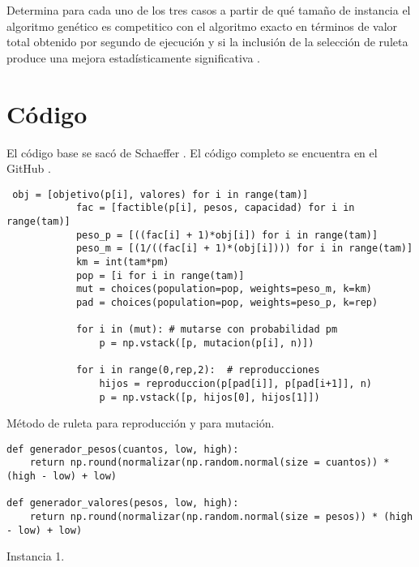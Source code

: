 \documentclass{article}
\begin{document}
Determina para cada uno de los tres casos a partir de qué tamaño de instancia el algoritmo genético es competitico con el algoritmo exacto en términos de valor total obtenido por segundo de ejecución y si la inclusión de la selección de ruleta produce una mejora estadísticamente significativa \cite{Satu_Elisa_Schaeffer}.

\newpage
\section{Código}
El código base se sacó de Schaeffer \cite{Elisa_Schaeffer}. El código completo se encuentra en el GitHub \cite{Denisse_Leyva}.

\renewcommand{\listingscaption}{Código}
\begin{listing}[H]
  \begin{verbatim}
 obj = [objetivo(p[i], valores) for i in range(tam)]
            fac = [factible(p[i], pesos, capacidad) for i in range(tam)]
            peso_p = [((fac[i] + 1)*obj[i]) for i in range(tam)]
            peso_m = [(1/((fac[i] + 1)*(obj[i]))) for i in range(tam)]
            km = int(tam*pm)
            pop = [i for i in range(tam)]
            mut = choices(population=pop, weights=peso_m, k=km)
            pad = choices(population=pop, weights=peso_p, k=rep)
        
            for i in (mut): # mutarse con probabilidad pm
                p = np.vstack([p, mutacion(p[i], n)])
                    
            for i in range(0,rep,2):  # reproducciones
                hijos = reproduccion(p[pad[i]], p[pad[i+1]], n)
                p = np.vstack([p, hijos[0], hijos[1]])
      \end{verbatim}
  \label{lst:fibo}
  \caption{Método de ruleta para reproducción y para mutación.}
\end{listing}

\renewcommand{\listingscaption}{Código}
\begin{listing}[H]
  \begin{verbatim}
def generador_pesos(cuantos, low, high):
    return np.round(normalizar(np.random.normal(size = cuantos)) * (high - low) + low)
 
def generador_valores(pesos, low, high):
    return np.round(normalizar(np.random.normal(size = pesos)) * (high - low) + low)
      \end{verbatim}
  \label{lst:fibo}
  \caption{Instancia 1.}
\end{listing}
\end{document}

